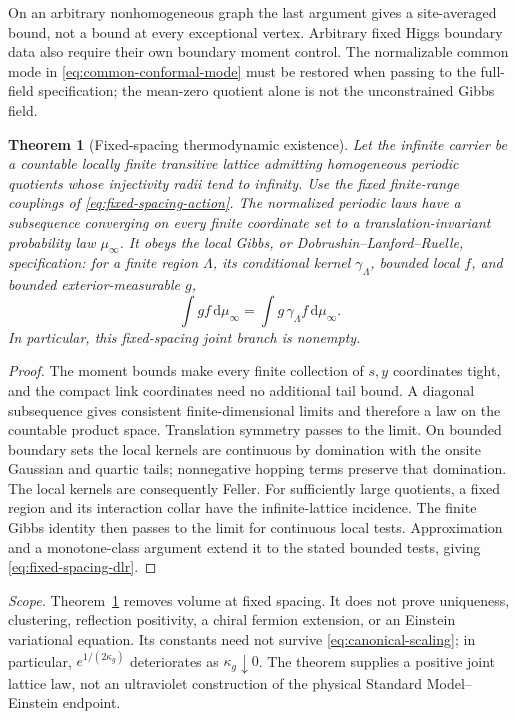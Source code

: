 \documentclass[11pt,a4paper,oneside]{book}
\theoremstyle{plain}
\newtheorem{theorem}{Theorem}[chapter]
\theoremstyle{definition}
\theoremstyle{remark}
\newcommand{\dd}{\mathrm d}
\newcommand{\src}[2]{\cite{#1}}
\newcommand{\scope}[1]{\par\smallskip\noindent\textit{Scope.} #1\par\smallskip}
\begin{document}
On an arbitrary nonhomogeneous graph the last argument gives a
site-averaged bound, not a bound at every exceptional vertex.  Arbitrary
fixed Higgs boundary data also require their own boundary moment control.
The normalizable common mode in \eqref{eq:common-conformal-mode} must be
restored when passing to the full-field specification; the mean-zero
quotient alone is not the unconstrained Gibbs field.

\begin{theorem}[Fixed-spacing thermodynamic existence]
\label{thm:fixed-spacing-dlr}
Let the infinite carrier be a countable locally finite transitive lattice
admitting homogeneous periodic quotients whose injectivity radii tend to
infinity.  Use the fixed finite-range couplings of
\eqref{eq:fixed-spacing-action}.  The normalized periodic laws have a
subsequence converging on every finite coordinate set to a
translation-invariant probability law $\mu_\infty$.  It obeys the local
Gibbs, or Dobrushin--Lanford--Ruelle, specification: for a finite region
$\Lambda$, its conditional kernel $\gamma_\Lambda$, bounded local $f$,
and bounded exterior-measurable $g$,
\begin{equation}
 \int gf\,\dd\mu_\infty
 =\int g\,\gamma_\Lambda f\,\dd\mu_\infty.
 \label{eq:fixed-spacing-dlr}
\end{equation}
In particular, this fixed-spacing joint branch is nonempty.
\end{theorem}
\begin{proof}
The moment bounds make every finite collection of $s,y$ coordinates
tight, and the compact link coordinates need no additional tail bound.
A diagonal subsequence gives consistent finite-dimensional limits and
therefore a law on the countable product space.  Translation symmetry
passes to the limit.  On bounded boundary sets the local kernels are
continuous by domination with the onsite Gaussian and quartic tails;
nonnegative hopping terms preserve that domination.  The local kernels
are consequently Feller.  For sufficiently large quotients, a fixed
region and its interaction collar have the infinite-lattice incidence.
The finite Gibbs identity then passes to the limit for continuous local
tests.  Approximation and a monotone-class argument extend it to the
stated bounded tests, giving \eqref{eq:fixed-spacing-dlr}.
\end{proof}
\src{R17}{lem:v17v43-feller,thm:v17v43-limit,thm:v17v43-dlr,cor:v17v43-nonempty}

\scope{Theorem~\ref{thm:fixed-spacing-dlr} removes volume at fixed spacing.
It does not prove uniqueness, clustering, reflection positivity, a chiral
fermion extension, or an Einstein variational equation.  Its constants
need not survive \eqref{eq:canonical-scaling}; in particular,
$e^{1/(2\kappa_g)}$ deteriorates as $\kappa_g\downarrow0$.
The theorem supplies a positive joint lattice law, not an ultraviolet
construction of the physical Standard Model--Einstein endpoint.}
\end{document}
